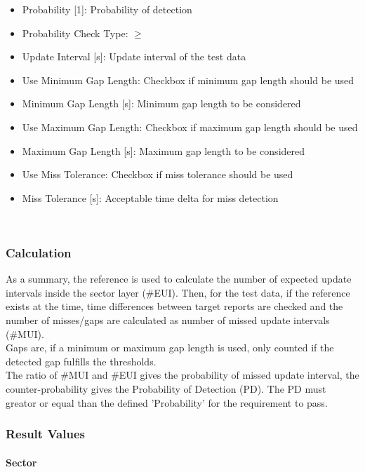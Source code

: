 \begin{itemize}  
\item Probability [1]: Probability of detection
\item Probability Check Type: $\geq$
\item Update Interval [s]: Update interval of the test data
\item Use Minimum Gap Length: Checkbox if minimum gap length should be used
\item Minimum Gap Length [s]: Minimum gap length to be considered
\item Use Maximum Gap Length: Checkbox if maximum gap length should be used
\item Maximum Gap Length [s]: Maximum gap length to be considered
\item Use Miss Tolerance: Checkbox if miss tolerance should be used
\item Miss Tolerance [s]: Acceptable time delta for miss detection
\end{itemize}
\ \\

\subsubsection{Calculation}

As a summary, the reference is used to calculate the number of expected update intervals inside the sector layer (\#EUI). Then, for the test data, if the reference exists at the time, time differences between target reports are checked and the number of misses/gaps are calculated as number of missed update intervals (\#MUI). \\

Gaps are, if a minimum or maximum gap length is used, only counted if the detected gap fulfills the thresholds. \\

The ratio of \#MUI and \#EUI gives the probability of missed update interval, the counter-probability gives the Probability of Detection (PD). The PD must greator or equal than the defined 'Probability' for the requirement to pass.

\subsubsection{Result Values}

\paragraph{Sector}

